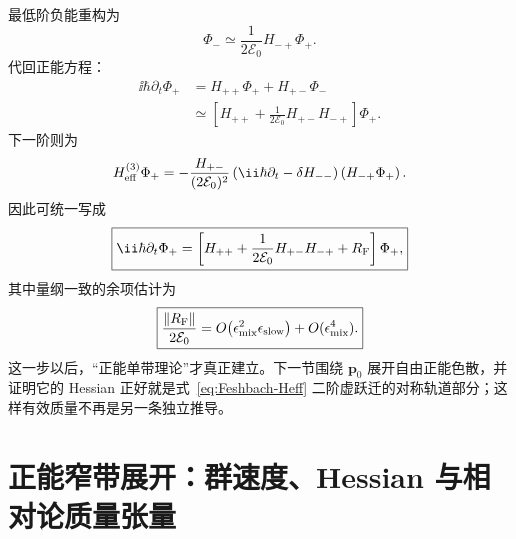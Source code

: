 最低阶负能重构为
\begin{equation}
 \boxed{
 \Phi_-\simeq\frac{1}{2\mathcal E_0}H_{-+}\Phi_+.}
 \label{eq:Feshbach-negative-leading}
\end{equation}
代回正能方程：
\begin{align}
\ii\hbar\partial_t\Phi_+
&=H_{++}\Phi_+ +H_{+-}\Phi_-\\
&\simeq
\left[H_{++}+\frac{1}{2\mathcal E_0}H_{+-}H_{-+}\right]\Phi_+.
\end{align}
下一阶则为
\begin{equation}
H_{\rm eff}^{(3)}\Phi_+
=-\frac{H_{+-}}{(2\mathcal E_0)^2}
\left(\ii\hbar\partial_t-\delta H_{--}\right)
\left(H_{-+}\Phi_+\right).
\label{eq:Feshbach-Heff-next}
\end{equation}
因此可统一写成
\begin{equation}
 \boxed{
 \ii\hbar\partial_t\Phi_+
 =\left[
 H_{++}
 +\frac{1}{2\mathcal E_0}H_{+-}H_{-+}
 +R_{\rm F}
 \right]\Phi_+,}
 \label{eq:Feshbach-Heff}
\end{equation}
其中量纲一致的余项估计为
\begin{equation}
 \boxed{
 \frac{\|R_{\rm F}\|}{2\mathcal E_0}
 =O\!\left(\epsilon_{\rm mix}^2\epsilon_{\rm slow}\right)
 +O(\epsilon_{\rm mix}^4).}
 \label{eq:Feshbach-remainder-estimate}
\end{equation}
这一步以后，“正能单带理论”才真正建立。下一节围绕 $\bm p_0$ 展开自由正能色散，并证明它的 Hessian 正好就是式~\eqref{eq:Feshbach-Heff} 二阶虚跃迁的对称轨道部分；这样有效质量不再是另一条独立推导。



\section{正能窄带展开：群速度、Hessian 与相对论质量张量}


